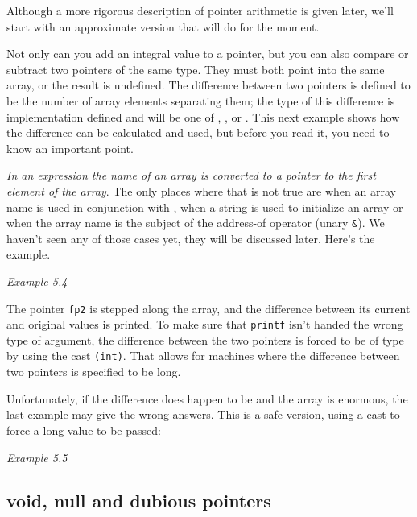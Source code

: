    Although a more rigorous description of pointer arithmetic is given
    later, we'll start with an approximate version that will do for the
    moment.


   Not only can you add an integral value to a pointer, but you can also
    compare or subtract two pointers of the same type. They must both point
    into the same array, or the result is undefined. The difference between
    two pointers is defined to be the number of array elements separating
    them; the type of this difference is implementation defined and will be
    one of \short, \kint, or \klong. This
    next example shows how the difference can be calculated and used, but
    before you read it, you need to know an important point.


   \textit{In an expression the name of an array is converted to a pointer to
    the first element of the array}. The only places where that is not
    true are when an array name is used in conjunction with
    \sizeof, when a string is used to initialize an array or
    when the array name is the subject of the address-of operator (unary
    \texttt{\&}). We haven't seen any of those cases yet, they will
    be discussed later. Here's the example.


    \begin{center}\textit{Example 5.4}\end{center}


   The pointer \texttt{fp2} is stepped along the array, and the
    difference between its current and original values is printed. To make
    sure that \texttt{printf} isn't handed the wrong type of argument,
    the difference between the two pointers is forced to be of type
    \kint{} by using the cast \texttt{(int)}. That allows for
    machines where the difference between two pointers is specified to be
    long.


   Unfortunately, if the difference does happen to be \klong{}
    and the array is enormous, the last example may give the wrong answers.
    This is a safe version, using a cast to force a long value to be
    passed:


    \begin{center}\textit{Example 5.5}\end{center}


  

  \subsection{void, null and dubious pointers}
   

